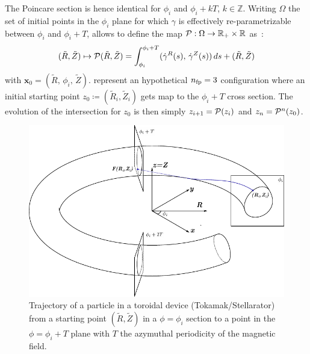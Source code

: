 The Poincare section is hence identical for $\phi_i$ and $\phi_i+kT$, $k\in\mathbb{Z}$. Writing $\Omega$ the set of initial points in the $\phi_i$ plane for which $\gamma$ is effectively re-parametrizable between $\phi_i$ and $\phi_i + T$, allows to define the map $\mathcal{P} : \Omega \rightarrow \mathbb{R}_+\times\mathbb{R}$ as~:
\begin{equation*}
    (\tilde{R},\tilde{Z}) \mapsto \mathcal{P}(\tilde{R},\tilde{Z}) = \int_{\phi_i}^{\phi_i+T}(
        \dot{\gamma}^R(s),\,
        \dot{\gamma}^Z(s)
    )\,ds + (\tilde{R},\tilde{Z})
\end{equation*}
with $\textbf{x}_0 = (\tilde{R},\,\phi_i,\,\tilde{Z})$.  represent an hypothetical $n_\text{fp} = 3$ configuration where an initial starting point $z_0\coloneqq (\tilde{R}_i,\tilde{Z}_i)$ gets map to the $\phi_i + T$ cross section. The evolution of the intersection for $z_0$ is then simply $z_{i+1} = \mathcal{P}(z_i)$ and $z_n = \mathcal{P}^n(z_0)$. 

\begin{figure}[H]
    \centering
    \includegraphics{images/theory/poincare-torus.pdf}
    \caption{Trajectory of a particle in a toroidal device (Tokamak/Stellarator) from a starting point $(\tilde{R}, \tilde{Z})$ in a $\phi = \phi_i$ section to a point in the $\phi = \phi_i + T$ plane with $T$ the azymuthal periodicity of the magnetic field.}
    \label{fig:th-poincare-map}
\end{figure}

